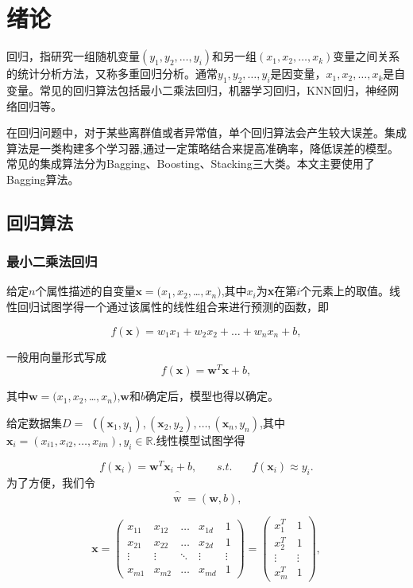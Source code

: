 \section{绪论}
回归，指研究一组随机变量$(y_1 ,y_2 ,\dots,y_i)$和另一组$(x_1,x_2,\dots,x_k)$变量之间关系的统计分析方法，又称多重回归分析。通常$y_1,y_2,\dots,y_i$是因变量，$x_1,x_2,\dots,x_k$是自变量。常见的回归算法包括最小二乘法回归，机器学习回归，KNN回归，神经网络回归等。

在回归问题中，对于某些离群值或者异常值，单个回归算法会产生较大误差。集成算法是一类构建多个学习器,通过一定策略结合来提高准确率，降低误差的模型。常见的集成算法分为Bagging、Boosting、Stacking三大类。本文主要使用了Bagging算法。

\subsection{回归算法}
\subsubsection{最小二乘法回归}
给定$n$个属性描述的自变量$\textbf{x}=(x_1,x_2,$\dots$,x_n)$,其中$x_i$为\textbf{x}在第$i$个元素上的取值。线性回归试图学得一个通过该属性的线性组合来进行预测的函数，即

\begin{equation}
f(\textbf{x})=w_1x_1+w_2x_2+\dots+w_nx_n+b, \label{1}
\end{equation}


一般用向量形式写成
\begin{equation}
f(\textbf{x})=\textbf{w}^T\textbf{x}+b,\label{2}
\end{equation}

其中$\textbf{w}=(x_1,x_2,$\dots$,x_n)$,$\textbf{w}$和$b$确定后，模型也得以确定。

给定数据集$D={（(\textbf{x}_1,y_1),(\textbf{x}_2,y_2),\dots,(\textbf{x}_n,y_n)}$,其中$\textbf{x}_i=(x_{i1},x_{i2},\dots,x_{im}),y_i \in \mathbb{R}$.线性模型试图学得

\begin{equation}
f(\textbf{x}_i)=\textbf{w}^T\textbf{x}_i+b,~~~~~~~~s.t. ~~~~~~~~f(\textbf{x}_i)\approx y_i .\label{3}
\end{equation}
为了方便，我们令
 $$\mathop{w}\limits^{\^{}}=(\textbf{w},b) ,$$
 
 $$\textbf{x}=\begin{pmatrix}
 x_{11}&  x_{12}&  \dots&  x_{1d}& 1\\
 x_{21}&  x_{22}&  \dots&  x_{2d}& 1\\
 \vdots&  \vdots& \ddots  &  \vdots& \vdots\\
 x_{m1}&  x_{m2}&  \dots&  x_{md}& 1
 \end{pmatrix}=\begin{pmatrix}
 x_{1}^T& 1\\
 x_{2}^T& 1\\
 \vdots& \vdots\\
 x_{m}^T& 1
 \end{pmatrix},$$
 
